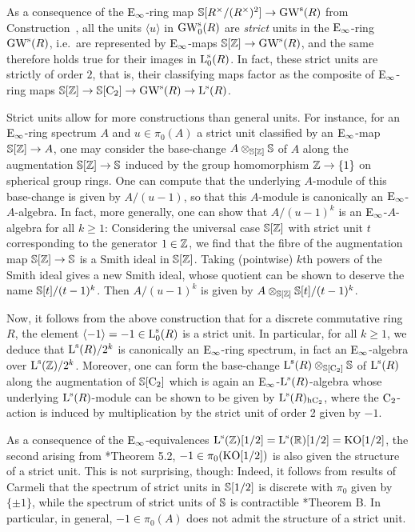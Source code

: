 \begin{remark}
As a consequence of the ${\mathrm{E}_{\infty}}$-ring map $\mathbb{S}[R^\times/(R^\times)^2] \to \operatorname{GW}^{\mathrm{s}}(R)$ from Construction~, all the units $\langle u \rangle$ in $\operatorname{GW}_0^{\mathrm{s}}(R)$ are \emph{strict} units in the ${\mathrm{E}_{\infty}}$-ring $\operatorname{GW}^{\mathrm{s}}(R)$, i.e.\ are represented by ${\mathrm{E}_{\infty}}$-maps $\mathbb{S}[\mathbb{Z}] \to \operatorname{GW}^{\mathrm{s}}(R)$, and the same therefore holds true for their images in $\operatorname L_0^{\mathrm{s}}(R)$. In fact, these strict units are strictly of order $2$, that is, their classifying maps factor as the composite of ${\mathrm{E}_{\infty}}$-ring maps $\mathbb{S}[\mathbb{Z}] \to \mathbb{S}[\mathrm{C_2}] \to \operatorname{GW}^{\mathrm{s}}(R) \to \operatorname L^{\mathrm{s}}(R)$. 

Strict units allow for more constructions than general units. For instance, for an ${\mathrm{E}_{\infty}}$-ring spectrum $A$ and $u \in \pi_0(A)$ a strict unit classified by an ${\mathrm{E}_{\infty}}$-map $\mathbb{S}[\mathbb{Z}] \to A$, one may consider the base-change $A \otimes_{\mathbb{S}[\mathbb{Z}]} \mathbb{S}$ of $A$ along the augmentation $\mathbb{S}[\mathbb{Z}] \to \mathbb{S}$ induced by the group homomorphism $\mathbb{Z} \to \{1\}$ on spherical group rings. One can compute that the underlying $A$-module of this base-change is given by $A/(u-1)$, so that this $A$-module is canonically an ${\mathrm{E}_{\infty}}$-$A$-algebra. In fact, more generally, one can show that $A/(u-1)^k$ is an ${\mathrm{E}_{\infty}}$-$A$-algebra for all $k\geq 1$: Considering the universal case $\mathbb{S}[\mathbb{Z}]$ with strict unit $t$ corresponding to the generator $1 \in \mathbb{Z}$, we find that the fibre of the augmentation map $\mathbb{S}[\mathbb{Z}] \to \mathbb{S}$ is a Smith ideal in $\mathbb{S}[\mathbb{Z}]$. Taking (pointwise) $k$th powers of the Smith ideal gives a new Smith ideal, whose quotient can be shown to deserve the name $\mathbb{S}[t]/(t-1)^k$. Then $A/(u-1)^k$ is given by $A \otimes_{\mathbb{S}[\mathbb{Z}]} \mathbb{S}[t]/(t-1)^k$.

Now, it follows from the above construction that for a discrete commutative ring $R$, the element $\langle -1 \rangle = -1 \in \operatorname L_0^{\mathrm{s}}(R)$ is a strict unit. In particular, for all $k\geq 1$, we deduce that $\operatorname L^{\mathrm{s}}(R)/2^k$ is canonically an ${\mathrm{E}_{\infty}}$-ring spectrum, in fact an ${\mathrm{E}_{\infty}}$-algebra over $\operatorname L^{\mathrm{s}}(\mathbb{Z})/2^k$. Moreover, one can form the base-change $\operatorname L^{\mathrm{s}}(R) \otimes_{\mathbb{S}[\mathrm{C_2}]} \mathbb{S}$ of $\operatorname L^{\mathrm{s}}(R)$ along the augmentation of $\mathbb{S}[\mathrm{C_2}]$ which is again an ${\mathrm{E}_{\infty}}$-$\operatorname L^{\mathrm{s}}(R)$-algebra whose underlying $\operatorname L^{\mathrm{s}}(R)$-module can be shown to be given by $\operatorname L^{\mathrm{s}}(R)_{{\mathrm{h}\mathrm{C_2}}}$, where the $\mathrm{C_2}$-action is induced by multiplication by the strict unit of order 2 given by $-1$.


As a consequence of the ${\mathrm{E}_{\infty}}$-equivalences $\operatorname L^{\mathrm{s}}(\mathbb{Z})[1/2] = \operatorname L^{\mathrm{s}}(\mathbb{R})[1/2] = \mathrm{KO}[1/2]$, the second arising from \cite{LN}*{Theorem 5.2}, $-1 \in \pi_0(\mathrm{KO}[1/2])$ is also given the structure of a strict unit. This is not surprising, though: Indeed, it follows from results of Carmeli that the spectrum of strict units in $\mathbb{S}[1/2]$ is discrete with $\pi_0$ given by $\{\pm 1\}$, while the spectrum of strict units of $\mathbb{S}$ is contractible \cite{Carmeli}*{Theorem B}. In particular, in general, $-1 \in \pi_0(A)$ does not admit the structure of a strict unit.
\end{remark}
